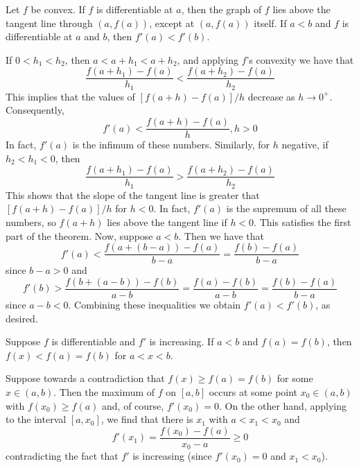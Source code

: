 \documentclass[12pt]{report}
\begin{document}
\begin{thm}{}{}
    Let $f$ be convex. If $f$ is differentiable at $a$, then the graph of $f$ lies above the tangent line through $(a,f(a))$, except at $(a,f(a))$ itself. If $a < b$ and $f$ is differentiable at $a$ and $b$, then $f'(a) < f'(b)$.
\end{thm}
\begin{proof*}{}{}
    If $0 < h_1 < h_2$, then $a < a+h_1 < a+h_2$, and applying $f$'s convexity we have that \begin{equation*}
        \frac{f(a+h_1) - f(a)}{h_1} < \frac{f(a+h_2)-f(a)}{h_2}
    \end{equation*}
    This implies that the values of $[f(a+h)-f(a)]/h$ decrease as $h\rightarrow 0^+$. Consequently, \begin{equation*}
        f'(a) < \frac{f(a+h)-f(a)}{h},h> 0
    \end{equation*}
    In fact, $f'(a)$ is the infimum of these numbers. Similarly, for $h$ negative, if $h_2 < h_1 < 0$, then \begin{equation*}
        \frac{f(a+h_1)-f(a)}{h_1} > \frac{f(a+h_2)-f(a)}{h_2}
    \end{equation*}
    This shows that the slope of the tangent line is greater that $[f(a+h)-f(a)]/h$ for $h < 0$. In fact, $f'(a)$ is the supremum of all these numbers, so $f(a+h)$ lies above the tangent line if $h < 0$. This satisfies the first part of the theorem. Now, suppose $a < b$. Then we have that \begin{equation*}
        f'(a) < \frac{f(a+(b-a)) - f(a)}{b-a} = \frac{f(b)-f(a)}{b-a}
    \end{equation*}
    since $b - a> 0$ and \begin{equation*}
        f'(b) > \frac{f(b+(a-b))-f(b)}{a-b} = \frac{f(a)-f(b)}{a-b} = \frac{f(b)-f(a)}{b-a}
    \end{equation*}
    since $a-b < 0$. Combining these inequalities we obtain $f'(a) < f'(b)$, as desired.
\end{proof*}


\begin{lem}{}{}
    Suppose $f$ is differentiable and $f'$ is increasing. If $a < b$ and $f(a) = f(b)$, then $f(x) < f(a) = f(b)$ for $a < x < b$.
\end{lem}
\begin{proof*}{}{}
    Suppose towards a contradiction that $f(x) \geq f(a) = f(b)$ for some $x \in (a,b)$. Then the maximum of $f$ on $[a,b]$ occurs at some point $x_0 \in (a,b)$ with $f(x_0) \geq f(a)$ and, of course, $f'(x_0) = 0$. On the other hand, applying  to the interval $[a,x_0]$, we find that there is $x_1$ with $a < x_1 < x_0$ and \begin{equation*}
        f'(x_1) = \frac{f(x_0) - f(a)}{x_0 - a}\geq 0
    \end{equation*}
    contradicting the fact that $f'$ is increasing (since $f'(x_0) = 0$ and $x_1 < x_0$).
\end{proof*}
\end{document}
